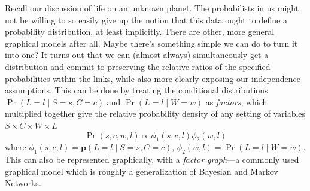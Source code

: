 \documentclass{article}
\begin{document}
	
	\begin{example}[continues=ex:planet]
		Recall our discussion of life on an unknown planet.
		The probabilists in us might not be willing to so easily give up the notion that this data ought to define a probability distribution, at least implicitly. There are other, more general graphical models after all.
		Maybe there's something simple we can do to turn it into one? It turns out that we can (almost always) simultaneously get a distribution and commit to preserving the relative ratios of the specified probabilities within the links, while also more clearly exposing our independence assumptions. 		
		This can be done by treating the conditional distributions $\Pr(L =l \mid S=s, C=c)$ and $\Pr(L=l \mid W=w)$ as \emph{factors}, which multiplied together give the relative probability density of any setting of variables $S \times C \times W \times L$
		\[ \Pr(s, c, w, l) \propto \phi_1(s,c,l) \phi_2(w,l) \]
		where $\phi_1(s,c,l) = \textbf{p}(L=l \mid S=s, C=c)$, $\phi_2(w,l) = \Pr(L=l\mid W=w)$. This can also be represented graphically, with a \emph{factor graph}---a commonly used graphical model which is roughly a generalization of Bayesian and Markov Networks.
		
		\begin{center}
\end{center}
\end{example}
\end{document}
